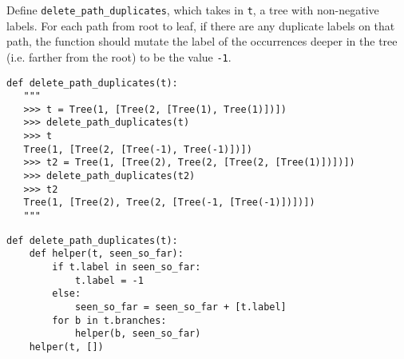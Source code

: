 \begin{blocksection}
\question
Define \texttt{delete\_path\_duplicates}, which takes in \texttt{t}, a tree
with non-negative labels. For each path from root to leaf, if there are any duplicate labels on that path,
the function should mutate the label of the occurrences
deeper in the tree (i.e. farther from the root) to be the value \texttt{-1}.

\begin{lstlisting}
def delete_path_duplicates(t):
   """
   >>> t = Tree(1, [Tree(2, [Tree(1), Tree(1)])])
   >>> delete_path_duplicates(t)
   >>> t
   Tree(1, [Tree(2, [Tree(-1), Tree(-1)])])
   >>> t2 = Tree(1, [Tree(2), Tree(2, [Tree(2, [Tree(1)])])])
   >>> delete_path_duplicates(t2)
   >>> t2
   Tree(1, [Tree(2), Tree(2, [Tree(-1, [Tree(-1)])])])
   """
\end{lstlisting}

\begin{solution}[2in]
\begin{lstlisting}
def delete_path_duplicates(t):
    def helper(t, seen_so_far):
        if t.label in seen_so_far:
            t.label = -1
        else:
            seen_so_far = seen_so_far + [t.label]
        for b in t.branches:
            helper(b, seen_so_far)
    helper(t, [])
\end{lstlisting}
\end{solution}
\end{blocksection}
